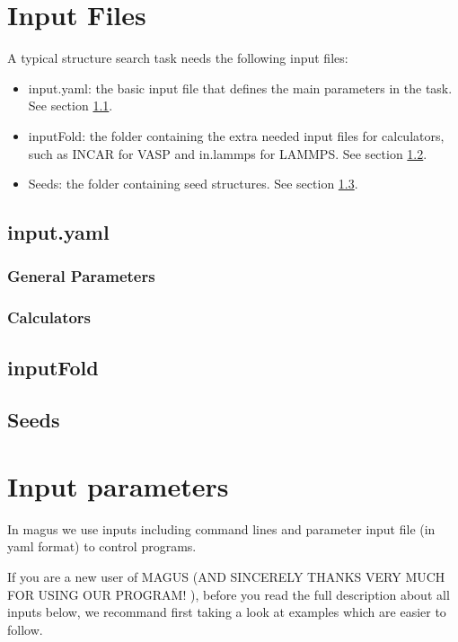 \documentclass[12pt,oneside]{book}
\begin{document}
\chapter{Input Files}
A typical structure search task needs the following input files:
\begin{itemize}
    \item input.yaml: the basic input file that defines the main parameters in the task. See section \ref{sec: input.yaml}.
    \item inputFold: the folder containing the extra needed input files for calculators, such as INCAR for VASP and in.lammps for LAMMPS. See section \ref{sec: inputFold}.
    \item Seeds: the folder containing seed structures. See section \ref{sec: Seeds}.
\end{itemize}
\section{input.yaml}\label{sec: input.yaml}
\subsection{General Parameters}

\subsection{Calculators}

\section{inputFold}\label{sec: inputFold}

\section{Seeds}\label{sec: Seeds}

\chapter{Input parameters}
In magus we use inputs including command lines and parameter input file (in yaml format) to control programs. 

If you are a new user of MAGUS (AND SINCERELY THANKS VERY MUCH FOR USING OUR PROGRAM! ), before you read the full description about all inputs below, we recommand first taking a look at examples which are easier to follow. 
\end{document}
